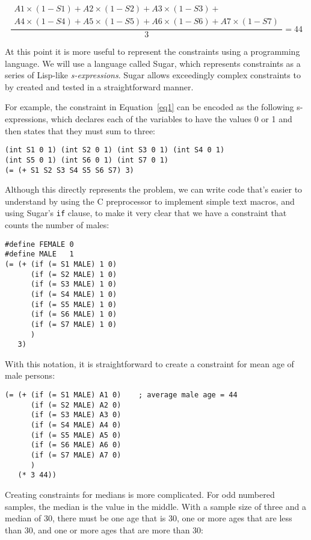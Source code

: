 \documentclass[runningheads]{llncs}
\begin{document}
\begin{equation}
\frac{
  \begin{split}
  A1 \times (1-S1) + A2 \times (1-S2) + A3 \times (1-S3) + \\
   A4 \times (1-S4) + A5 \times (1-S5) + A6 \times (1-S6) + A7 \times (1-S7)
  \end{split}
}{3} = 44
\end{equation}

At this point it is more useful to represent the constraints using a
programming language. We will use a language called Sugar\cite{sugar},
which represents constraints as a series of Lisp-like
\textit{s-expressions}\cite{McCarthy:1960:RFS:367177.367199}. Sugar
allows exceedingly complex constraints to by created and tested in a
straightforward manner. 

For example, the constraint in Equation~\ref{eq1} can be encoded as the following
s-expressions, which declares each of the variables to have the values
0 or 1 and then states that they must sum to three:
\begin{Verbatim}
(int S1 0 1) (int S2 0 1) (int S3 0 1) (int S4 0 1)
(int S5 0 1) (int S6 0 1) (int S7 0 1)
(= (+ S1 S2 S3 S4 S5 S6 S7) 3)
\end{Verbatim}

Although this directly represents the problem, we can write code
that's easier to understand by using the C preprocessor to implement
simple text macros, and using Sugar's \texttt{if} clause, to make it
very clear that we have a constraint that counts the number of males:

\begin{Verbatim}
#define FEMALE 0
#define MALE   1
(= (+ (if (= S1 MALE) 1 0)  
      (if (= S2 MALE) 1 0)
      (if (= S3 MALE) 1 0)
      (if (= S4 MALE) 1 0)
      (if (= S5 MALE) 1 0)
      (if (= S6 MALE) 1 0)
      (if (= S7 MALE) 1 0)
      )
   3)
\end{Verbatim}

With this notation, it is straightforward to create a constraint for
mean age of male persons:

\begin{Verbatim}
(= (+ (if (= S1 MALE) A1 0)    ; average male age = 44
      (if (= S2 MALE) A2 0)
      (if (= S3 MALE) A3 0)
      (if (= S4 MALE) A4 0)
      (if (= S5 MALE) A5 0)
      (if (= S6 MALE) A6 0)
      (if (= S7 MALE) A7 0)
      )
   (* 3 44))
\end{Verbatim}

Creating constraints for medians is more complicated. For odd numbered samples, the median is the value in the middle. With a sample size of three and a median of 30, there must be one age that is 30, one or more ages that are less than 30, and one or more ages that are more than 30:
\end{document}
